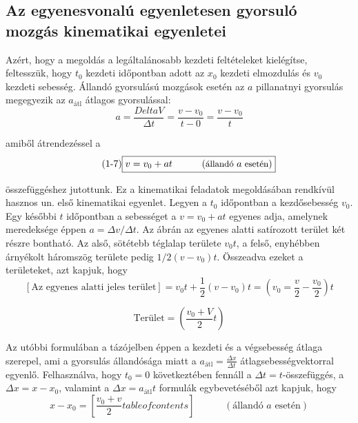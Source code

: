 \documentclass[../fizika.tex]{subfiles}
\begin{document}
            \subsection{Az egyenesvonalú egyenletesen gyorsuló mozgás kinematikai egyenletei}

                \noindent Azért, hogy a megoldás a legáltalánosabb kezdeti feltételeket kielégítse, feltesszük, hogy $t_0$ kezdeti időpontban adott az $x_0$ kezdeti elmozdulás és $v_0$ kezdeti sebesség. Állandó gyorsulású mozgások esetén az $a$ pillanatnyi gyorsulás megegyezik az $a_{\text{átl}}$ átlagos gyorsulással:
                    \begin{equation*}
                        a = \frac{Delta V}{\Delta t} = \frac{v-v_0}{t-0} = \frac{v-v_0}{t}
                    \end{equation*}

                \noindent amiből átrendezéssel a 
                    \begin{equation} \tag{1-7} \label{eq:1-7}
                        \boxed{v= v_0 + at \;\;\;\;\;\;\;\;\;\;\; \small(\text{állandó }a\text{ esetén})}
                    \end{equation}

                \noindent összefüggéshez jutottunk. Ez a kinematikai feladatok megoldásában rendkívül hasznos un. első kinematikai egyenlet. Legyen a $t_0$ időpontban a kezdősebesség $v_0$. Egy későbbi $t$ időpontban a sebességet a $v = v_0 + at$ egyenes adja, amelynek meredeksége éppen $a = \Delta v/\Delta t$. Az ábrán az egyenes alatti satírozott terület két részre bontható. Az alső, sötétebb téglalap területe $v_0t$, a felső, enyhébben árnyékolt háromszög területe pedig $1/2(v-v_0)t$. Összeadva ezeket a területeket, azt kapjuk, hogy 
                    \begin{equation*}
                        \left[\text{Az egyenes alatti jeles terület}\right] = v_0t+\frac{1}{2}(v-v_0)t= \left(v_0=\frac{v}{2}-\frac{v_0}{2}\right)t
                    \end{equation*}

                    \begin{equation*}
                        \text{Terület} = \left(\frac{v_0+V}{2}t\right)
                    \end{equation*}

                \noindent Az utóbbi formulában a tázójelben éppen a kezdeti és a végsebesség átlaga szerepel, ami a gyorsulás állandósága miatt a $a_{\text{átl}} = \frac{\Delta x}{\Delta t}$ átlagsebességvektorral egyenlő. Felhasználva, hogy $t_0 = 0$ következtében fennáll a $\Delta t = t$-összefüggés, a $\Delta x = x-x_0$, valamint a $\Delta x = a_{\text{átl}}t$ formulák egybevetéséből azt kapjuk, hogy 
                    \begin{equation*} \tag{1-8} \label{eq:1-8}
                        x-x_0= \left[\frac{v_0+v}{2}tableofcontents\right] \;\;\;\;\;\;\;\;\;\;\; (\text{állandó }a\text{ esetén})
                    \end{equation*}
\end{document}
